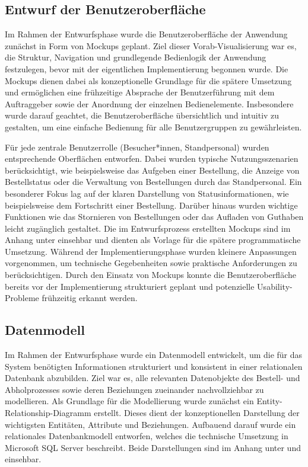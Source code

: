 \subsection{Entwurf der Benutzeroberfläche}
\label{sec:Benutzeroberflaeche} 
Im Rahmen der Entwurfsphase wurde die Benutzeroberfläche der Anwendung zunächst in Form von Mockups geplant. Ziel dieser Vorab-Visualisierung war es,
die Struktur, Navigation und grundlegende Bedienlogik der Anwendung festzulegen, bevor mit der eigentlichen Implementierung begonnen wurde.
Die Mockups dienen dabei als konzeptionelle Grundlage für die spätere Umsetzung und ermöglichen eine frühzeitige Absprache der Benutzerführung mit dem Auftraggeber
sowie der Anordnung der einzelnen Bedienelemente. Insbesondere wurde darauf geachtet, die Benutzeroberfläche übersichtlich und intuitiv zu gestalten, um eine einfache
Bedienung für alle Benutzergruppen zu gewährleisten.

Für jede zentrale Benutzerrolle (Besucher*innen, Standpersonal) wurden entsprechende Oberflächen entworfen. Dabei wurden typische Nutzungsszenarien berücksichtigt, wie
beispielsweise das Aufgeben einer Bestellung, die Anzeige von Bestellstatus oder die Verwaltung von Bestellungen durch das Standpersonal.
Ein besonderer Fokus lag auf der klaren Darstellung von Statusinformationen, wie beispielsweise dem Fortschritt einer Bestellung. Darüber hinaus wurden wichtige Funktionen
wie das Stornieren von Bestellungen oder das Aufladen von Guthaben leicht zugänglich gestaltet. Die im Entwurfsprozess erstellten Mockups sind im Anhang unter
 einsehbar und dienten als Vorlage für die spätere programmatische Umsetzung.
Während der Implementierungsphase wurden kleinere Anpassungen vorgenommen, um technische Gegebenheiten sowie praktische Anforderungen zu berücksichtigen.
Durch den Einsatz von Mockups konnte die Benutzeroberfläche bereits vor der Implementierung strukturiert geplant und potenzielle Usability-Probleme frühzeitig erkannt werden.

\subsection{Datenmodell}
\label{sec:Datenmodell}
Im Rahmen der Entwurfsphase wurde ein Datenmodell entwickelt, um die für das System benötigten Informationen strukturiert und konsistent in einer relationalen Datenbank
abzubilden. Ziel war es, alle relevanten Datenobjekte des Bestell- und Abholprozesses sowie deren Beziehungen zueinander nachvollziehbar zu modellieren. Als Grundlage
für die Modellierung wurde zunächst ein Entity-Relationship-Diagramm erstellt. Dieses dient der konzeptionellen Darstellung der wichtigsten Entitäten, Attribute und Beziehungen.
Aufbauend darauf wurde ein relationales Datenbankmodell entworfen, welches die technische Umsetzung in Microsoft SQL Server beschreibt. Beide Darstellungen sind im Anhang unter
 und  einsehbar.

